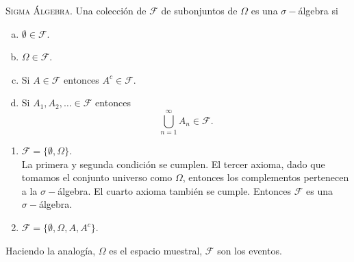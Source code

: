 \begin{definicion}
	{\scshape{Sigma Álgebra.}} Una colección de $\mathscr{F}$ de subonjuntos de $\Omega$ es una $\sigma -$álgebra si
	\begin{enumerate}[a)]
		\item $\emptyset \in \mathscr{F}$.
		\item $\Omega \in \mathscr{F}$.
		\item Si $A \in \mathscr{F}$ entonces $A^c \in \mathscr{F}$.
		\item Si $A_1 ,A_2,\ldots \in \mathscr{F}$ entonces
			$$\bigcup _{n=1} ^\infty A_n \in \mathscr{F}.$$
	\end{enumerate}
\end{definicion}


\begin{ejemplo} \it
	\begin{enumerate}
		\item $\mathscr{F} = \{ \emptyset ,\Omega \}$. \\
			La primera y segunda condición se cumplen. El tercer axioma, dado que tomamos el conjunto universo como $\Omega$, entonces los complementos pertenecen a la $\sigma -$álgebra. El cuarto axioma también se cumple. Entonces $\mathscr{F}$ es una $\sigma -$álgebra.
		\item $\mathscr{F} = \{ \emptyset ,\Omega , A,A^c \}$.
	\end{enumerate}
\end{ejemplo}

Haciendo la analogía, $\Omega$ es el espacio muestral, $\mathscr{F}$ son los eventos.





